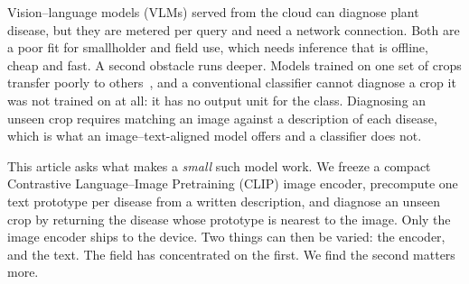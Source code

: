 \documentclass[a4paper,fleqn]{cas-dc}
\begin{document}
Vision--language models (VLMs) served from the cloud can diagnose plant disease, but they are
metered per query and need a network connection. Both are a poor fit for
smallholder and field use, which needs inference that is offline, cheap and fast. A second obstacle
runs deeper. Models trained on one set of crops transfer poorly to others~\citep{bouacida2025}, and
a conventional classifier cannot diagnose a crop it was not trained on at all: it has no output unit
for the class. Diagnosing an unseen crop requires matching an image against a description of each
disease, which is what an image--text-aligned model offers and a classifier does not.

This article asks what makes a \emph{small} such model work. We freeze a compact Contrastive
Language--Image Pretraining (CLIP) image encoder, precompute one text prototype per disease from a
written description, and diagnose an unseen crop by returning the disease whose prototype is nearest
to the image. Only the image encoder ships to the device. Two things can then be varied: the encoder,
and the text. The field has concentrated on the first. We find the second matters more.
\end{document}
